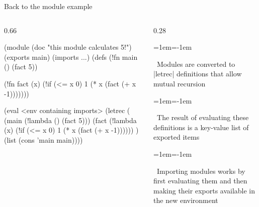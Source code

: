 \begin{frame}[fragile]{Back to the module example}
\begin{columns}[c,onlytextwidth]
\begin{column}{0.66\textwidth}
\begin{listingbox}\begin{ildcode}
(module
  (doc "this module calculates 5!")
  (exports main)
  (imports ...)
  (defs
    (!fn main () (fact 5))

    (!fn fact (x)
      (!if (<= x 0)
        1
        (* x (fact (+ x -1)))))))
\end{ildcode}\end{listingbox}
\par\noindent\hfill{}\hfill\null\par
\begin{listingbox}\begin{ildcode}
(eval <env containing imports> (letrec
    ( (main (!lambda () (fact 5)))
      (fact (!lambda (x)
              (!if (<= x 0)
                1
                (* x (fact (+ x -1)))))) )
  (list (cons 'main main))))
\end{ildcode}\end{listingbox}
\end{column}
\begin{column}{0.28\textwidth}
\par\vspace{1em}
{\leftskip=1em\parindent=-1em\raggedright
\noindent{}~Modules are converted to \linline|letrec| definitions that allow mutual recursion\par}
\vspace{1.5em}
{\leftskip=1em\parindent=-1em\raggedright
\noindent{}~The result of evaluating these definitions is a key-value list of exported items\par}
\vspace{1.5em}
{\leftskip=1em\parindent=-1em\raggedright
\noindent{}~Importing modules works by first evaluating them and then making their exports available in the new environment\par}
\vspace{1em}
\end{column}
\end{columns}
\end{frame}

